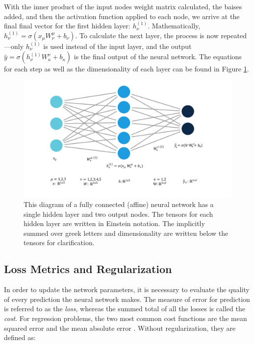 With the inner product of the input nodes weight matrix calculated, the baises added, and then the activation function applied to each node, we arrive at the final final vector for the first hidden layer: $ h_\nu^{(1)} $. Mathematically, $ h_\nu^{(1)} = \sigma\left( x_\mu W_\nu ^\mu + b_\nu \right) $. To calculate the next layer, the process is now repeated---only $ h_\nu^{(1)} $ is used instead of the input layer, and the output
$ \hat{y} = \sigma \left( h_\nu^{(1)} W_\kappa ^\nu + b_\kappa \right)$ is the final output of the neural network. The equations for each step as well as the dimensionality of each layer can be found in Figure \ref{fig:simpleNN}.

\begin{figure}[h!]
    \centering
    \includegraphics[width=\linewidth]{Chapters/Figures/einstein_NN_2.pdf}
    \caption[Neural Network Example]{This diagram of a fully connected (affine) neural network has a single hidden layer and two output nodes. The tensors for each hidden layer are written in Einstein notation. The implicitly summed over greek letters and dimensionality are written below the tensors for clarification.}
    \label{fig:simpleNN}
\end{figure}

\subsection{Loss Metrics and Regularization}
In order to update the network parameters, it is necessary to evaluate the quality of every prediction the neural network makes. The measure of error for prediction is referred to as the \textit{loss}, whereas the summed total of all the losses is called the \textit{cost}. For regression problems, the two most common cost functions are the mean squared error and the mean absolute error \cite{regularization-2017survey}. Without regularization, they are defined as:

